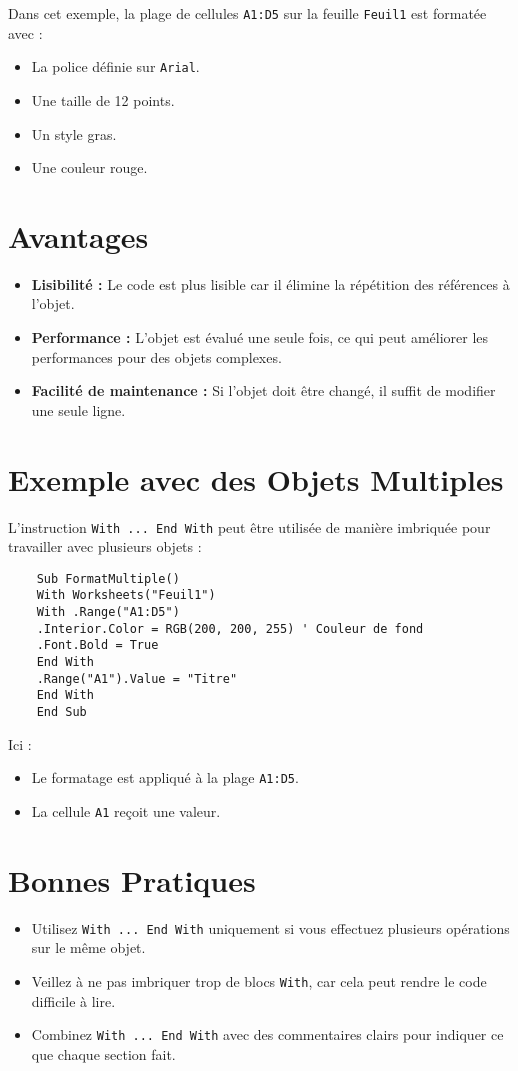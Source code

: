 \documentclass[a4paper,12pt]{report}
\begin{document}
Dans cet exemple, la plage de cellules \texttt{A1:D5} sur la feuille \texttt{Feuil1} est formatée avec :
\begin{itemize}
	\item La police définie sur \texttt{Arial}.
	\item Une taille de 12 points.
	\item Un style gras.
	\item Une couleur rouge.
\end{itemize}

\section{Avantages}
\begin{itemize}
	\item \textbf{Lisibilité :} Le code est plus lisible car il élimine la répétition des références à l'objet.
	\item \textbf{Performance :} L'objet est évalué une seule fois, ce qui peut améliorer les performances pour des objets complexes.
	\item \textbf{Facilité de maintenance :} Si l'objet doit être changé, il suffit de modifier une seule ligne.
\end{itemize}
\newpage
\section{Exemple avec des Objets Multiples}
L'instruction \texttt{With ... End With} peut être utilisée de manière imbriquée pour travailler avec plusieurs objets :
\begin{lstlisting}
	Sub FormatMultiple()
	With Worksheets("Feuil1")
	With .Range("A1:D5")
	.Interior.Color = RGB(200, 200, 255) ' Couleur de fond
	.Font.Bold = True
	End With
	.Range("A1").Value = "Titre"
	End With
	End Sub
\end{lstlisting}

Ici :
\begin{itemize}
	\item Le formatage est appliqué à la plage \texttt{A1:D5}.
	\item La cellule \texttt{A1} reçoit une valeur.
\end{itemize}

\section{Bonnes Pratiques}
\begin{itemize}
	\item Utilisez \texttt{With ... End With} uniquement si vous effectuez plusieurs opérations sur le même objet.
	\item Veillez à ne pas imbriquer trop de blocs \texttt{With}, car cela peut rendre le code difficile à lire.
	\item Combinez \texttt{With ... End With} avec des commentaires clairs pour indiquer ce que chaque section fait.
\end{itemize}
\newpage
\end{document}
